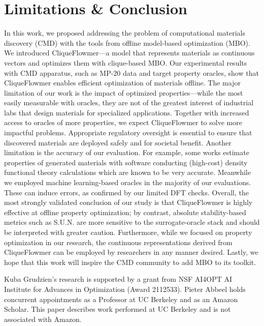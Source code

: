 \documentclass{article}
\theoremstyle{plain}
\theoremstyle{definition}
\theoremstyle{remark}
\begin{document}
\vspace{-8pt}
\section{Limitations \& Conclusion}
\vspace{-8pt}
In this work, we proposed addressing the problem of computational materials discovery (CMD) with the tools from offline model-based optimization (MBO).
We introduced CliqueFlowmer---a model 
that represents materials as continuous vectors and optimizes them with clique-based MBO. 
Our experimental results with CMD apparatus, such as MP-20 data and target property oracles, show that CliqueFlowmer enables efficient optimization of materials offline.
The major limitation of our work is the impact of optimized properties---while the most easily measurable with oracles, they are not of the greatest interest of industrial labs that design materials for specialized applications. 
Together with increased access to oracles of more properties, we expect CliqueFlowmer to solve more impactful problems.
Appropriate regulatory oversight is essential to ensure that discovered materials are deployed safely and for societal benefit.
Another limitation is the accuracy of our evaluation.
For example, some works estimate properties of generated materials with software conducting (high-cost) density functional theory calculations which are known to be very accurate.
Meanwhile we employed machine learning-based oracles in the majority of our evaluations.
These can induce errors, as confirmed by our limited DFT checks.
Overall, the most strongly validated conclusion of our study is that CliqueFlowmer is highly effective at offline property optimization; by contrast, absolute stability-based metrics such as S.U.N. are more sensitive to the surrogate-oracle stack and should be interpreted with greater caution.
Furthermore, while we focused on property optimization in our research, the continuous representations derived from CliqueFlowmer can be employed by researchers in any manner desired. 
Lastly, we hope that this work will inspire the CMD community to add MBO to its toolkit.


\clearpage
\begin{ack}
Kuba Grudzien's research is supported by a grant from NSF AI4OPT AI Institute for Advances in Optimization (Award 2112533).
Pieter Abbeel holds concurrent appointments as a Professor at UC Berkeley and as an Amazon Scholar. This paper describes work performed at UC Berkeley and is not associated with Amazon.
\end{ack}
\end{document}
